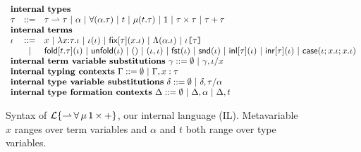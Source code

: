 
\begin{figure}[p]
\small
$\begin{array}{lcl}%
\multicolumn{3}{>{$}l<{$}}{\textbf{internal types}}\\
\ity & ::= & \multicolumn{1}{l}{\iparr{\ity}{\ity} ~|~ \alpha ~|~ \iforall{\alpha}{\ity} ~|~ t ~|~ \imu{t}{\ity} ~|~ \iunit ~|~ \iprod{\ity}{\ity} ~|~ \isum{\ity}{\ity}}\\
\multicolumn{3}{>{$}l<{$}}{\textbf{internal terms}}\\
\itm & ::= & \multicolumn{1}{l}{x ~|~ \ilam{\ity}{x}{\itm} ~|~ \iap{\itm}{\itm} ~|~ \ifix{\ity}{x}{\itm} ~|~ \iLam{\alpha}{\itm} ~|~ \iAp{\ity}{\itm}}\\
& ~|~ & \ifold{t}{\ity}{\itm} ~|~ \iunfold{\itm} ~|~ \itriv ~|~ \ipair{\itm}{\itm} ~|~ \ifst{\itm} ~|~ \isnd{\itm} ~|~ \iinl{\ity}{\itm} ~|~ \iinr{\ity}{\itm} ~|~ \icase{\itm}{x}{\itm}{x}{\itm}\\
\multicolumn{3}{l}{\textbf{internal term variable substitutions}~\gamma ::=  \emptyset ~|~ \gamma, \iota/x}\\
\multicolumn{3}{l}{\textbf{internal typing contexts}~\Gamma ::= \emptyset ~|~ \Gamma, x : \tau}\\
\multicolumn{3}{l}{\textbf{internal type variable substitutions}~\delta ::=  \emptyset ~|~ \delta, \tau/\alpha}\\\multicolumn{3}{l}{\textbf{internal type formation contexts}~\Delta ::= \emptyset ~|~ \Delta, \alpha ~|~ \Delta, t}\\
\end{array}%
$
\caption[Syntax of Internal Language (IL)]{Syntax of {$\mathcal{L}\{{\rightharpoonup}\,{\forall}\,{\mu}\,{{\sf 1}}\,{\times}\,{+}\}$}, our internal language (IL). Metavariable $x$ ranges over term variables and $\alpha$ and $t$ both range over type variables.}
\label{syntax-IL}
\end{figure}


